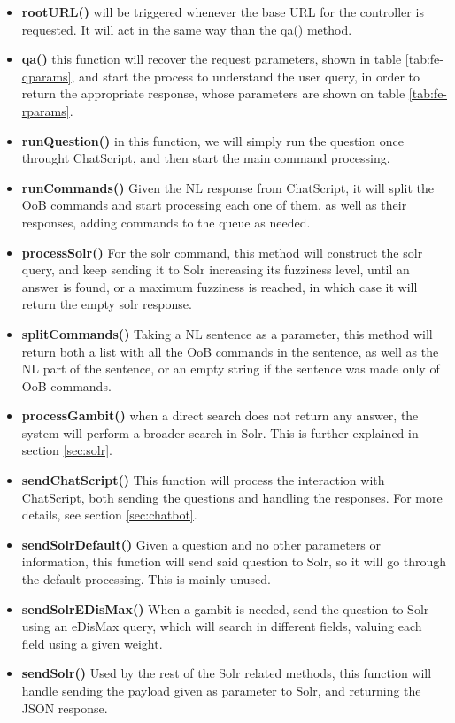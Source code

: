 \begin{itemize}
  \item \textbf{rootURL()} will be triggered whenever the base URL for the controller is requested. It will act in the same way than the qa() method.
  \item \textbf{qa()} this function will recover the request parameters, shown in table \ref{tab:fe-qparams}, and start the process to understand the user query, in order to return the appropriate response, whose parameters are shown on table \ref{tab:fe-rparams}.
  \item \textbf{runQuestion()} in this function, we will simply run the question once throught ChatScript, and then start the main command processing.
  \item \textbf{runCommands()} Given the \ac{NL} response from ChatScript, it will split the \ac{OoB} commands and start processing each one of them, as well as their responses, adding commands to the queue as needed.
  \item \textbf{processSolr()} For the solr command, this method will construct the solr query, and keep sending it to Solr increasing its fuzziness level, until an answer is found, or a maximum fuzziness is reached, in which case it will return the empty solr response.
  \item \textbf{splitCommands()} Taking a \ac{NL} sentence as a parameter, this method will return both a list with all the \ac{OoB} commands in the sentence, as well as the \ac{NL} part of the sentence, or an empty string if the sentence was made only of \ac{OoB} commands. 
  \item \textbf{processGambit()} when a direct search does not return any answer, the system will perform a broader search in Solr. This is further explained in section \ref{sec:solr}.
  \item \textbf{sendChatScript()} This function will process the interaction with ChatScript, both sending the questions and handling the responses. For more details, see section \ref{sec:chatbot}.
  \item \textbf{sendSolrDefault()} Given a question and no other parameters or information, this function will send said question to Solr, so it will go through the default processing. This is mainly unused.
  \item \textbf{sendSolrEDisMax()} When a gambit is needed, send the question to Solr using an \ac{eDisMax} query, which will search in different fields, valuing each field using a given weight. 
  \item \textbf{sendSolr()} Used by the rest of the Solr related methods, this function will handle sending the payload given as parameter to Solr, and returning the JSON response.
\end{itemize}

